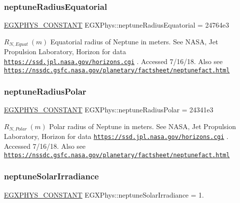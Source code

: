 \subsubsection{\texorpdfstring{neptune\+Radius\+Equatorial}{neptuneRadiusEquatorial}}
{\footnotesize\ttfamily \mbox{\hyperlink{group___e_g_x_phys-_constants-_macros_ga76980d288494ce1714c9ac68a95ba702}{E\+G\+X\+P\+H\+Y\+S\+\_\+\+C\+O\+N\+S\+T\+A\+NT}} E\+G\+X\+Phys\+::neptune\+Radius\+Equatorial = 24764e3}

$R_{N,Equat} \ (m)$ Equatorial radius of Neptune in meters. See N\+A\+SA, Jet Propulsion Laboratory, Horizon for data \href{https://ssd.jpl.nasa.gov/horizons.cgi}{\tt https\+://ssd.\+jpl.\+nasa.\+gov/horizons.\+cgi} . Accessed 7/16/18. Also see \href{https://nssdc.gsfc.nasa.gov/planetary/factsheet/neptunefact.html}{\tt https\+://nssdc.\+gsfc.\+nasa.\+gov/planetary/factsheet/neptunefact.\+html} \mbox{\label{group___e_g_x_phys-_constants-_astrophysics-_solar_system-_neptune-_bulk_gacf77a3d2ab4e31942c751c2d27d7c13d}} 
\subsubsection{\texorpdfstring{neptune\+Radius\+Polar}{neptuneRadiusPolar}}
{\footnotesize\ttfamily \mbox{\hyperlink{group___e_g_x_phys-_constants-_macros_ga76980d288494ce1714c9ac68a95ba702}{E\+G\+X\+P\+H\+Y\+S\+\_\+\+C\+O\+N\+S\+T\+A\+NT}} E\+G\+X\+Phys\+::neptune\+Radius\+Polar = 24341e3}

$R_{N,Polar} \ (m)$ Polar radius of Neptune in meters. See N\+A\+SA, Jet Propulsion Laboratory, Horizon for data \href{https://ssd.jpl.nasa.gov/horizons.cgi}{\tt https\+://ssd.\+jpl.\+nasa.\+gov/horizons.\+cgi} . Accessed 7/16/18. Also see \href{https://nssdc.gsfc.nasa.gov/planetary/factsheet/neptunefact.html}{\tt https\+://nssdc.\+gsfc.\+nasa.\+gov/planetary/factsheet/neptunefact.\+html} \mbox{\label{group___e_g_x_phys-_constants-_astrophysics-_solar_system-_neptune-_bulk_ga85ea5c81fef253c61cf0be8e712ae180}} 
\subsubsection{\texorpdfstring{neptune\+Solar\+Irradiance}{neptuneSolarIrradiance}}
{\footnotesize\ttfamily \mbox{\hyperlink{group___e_g_x_phys-_constants-_macros_ga76980d288494ce1714c9ac68a95ba702}{E\+G\+X\+P\+H\+Y\+S\+\_\+\+C\+O\+N\+S\+T\+A\+NT}} E\+G\+X\+Phys\+::neptune\+Solar\+Irradiance = 1.}

